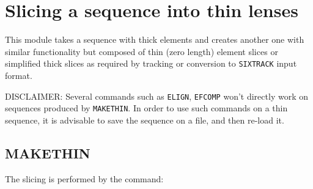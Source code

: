  
\chapter{Slicing a sequence into thin lenses}
\label{chap:makethin}

This module takes a sequence with thick elements and creates another one 
with similar functionality but composed of
thin (zero length) element slices or simplified thick slices as required
by \madx tracking or conversion to \texttt{SIXTRACK} input format.

DISCLAIMER: Several \madx commands such as {\texttt{ELIGN}}, {\texttt{EFCOMP}} won't directly work on sequences produced by {\texttt{MAKETHIN}}. In order to use such commands on a thin sequence, it is advisable to save the sequence on a file, and then re-load it.

\section{MAKETHIN}
\label{sec:makethin}

The slicing is performed by the command: 

